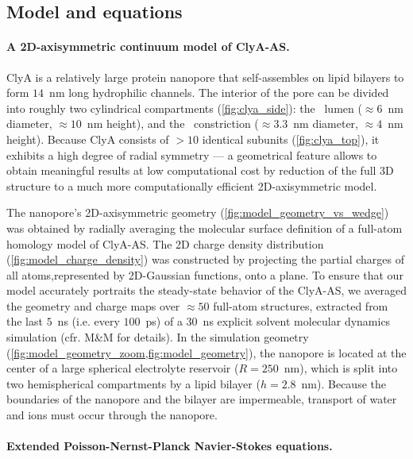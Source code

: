\documentclass[journal=ancac3,manuscript=article,etalmode=truncate,maxauthors=0,layout=twocolumn]{achemso}
\begin{document}
\subsection{Model and equations}



\paragraph{A 2D-axisymmetric continuum model of ClyA-AS.}
ClyA is a relatively large protein nanopore that self-assembles on lipid bilayers to form $14$~nm long
hydrophilic channels. The interior of the pore can be divided into roughly two cylindrical compartments
(\cref{fig:clya_side}): the \cis\ lumen ($\approx6$~nm diameter, $\approx10$~nm height), and the \trans\
constriction ($\approx3.3$~nm diameter, $\approx4$~nm height). Because ClyA consists of $>10$ identical
subunits (\cref{fig:clya_top}), it exhibits a high degree of radial symmetry --- a geometrical feature allows
to obtain meaningful results at low computational cost by reduction of the full 3D structure to a much more
computationally efficient 2D-axisymmetric model.\cite{Pederson-2015,Lu-2012}

The nanopore's 2D-axisymmetric geometry (\cref{fig:model_geometry_vs_wedge}) was obtained by radially
averaging the molecular surface definition of a full-atom homology model of ClyA-AS. The 2D charge density
distribution (\cref{fig:model_charge_density}) was constructed by projecting the partial charges of all atoms,represented by 2D-Gaussian functions, onto a plane. To ensure that our model accurately portraits the
steady-state behavior of the ClyA-AS, we averaged the geometry and charge maps over $\approx50$ full-atom
structures, extracted from the last $5$~ns (i.e. every $100$~ps) of a $30$~ns explicit solvent molecular
dynamics simulation (cfr. M\&M for details). In the simulation geometry
(\cref{fig:model_geometry_zoom,fig:model_geometry}), the nanopore is located at the center of a large
spherical electrolyte reservoir ($R=250$~nm), which is split into two hemispherical compartments by a lipid
bilayer ($h=2.8$~nm). Because the boundaries of the nanopore and the bilayer are impermeable, transport of
water and ions must occur through the nanopore.

\paragraph{Extended Poisson-Nernst-Planck Navier-Stokes equations.}
\end{document}
